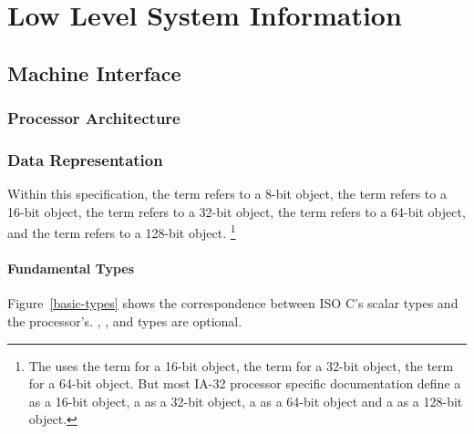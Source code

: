 \chapter{Low Level System Information}

\section{Machine Interface}

\subsection{Processor Architecture}

\subsection{Data Representation}

Within this specification, the term \emph{\textindex{\byte{}}} refers to
a 8-bit object, the term \emph{\textindex{\twobyte{}}} refers to a 16-bit
object, the term \emph{\textindex{\fourbyte{}}} refers to a 32-bit
object, the term \emph{\textindex{\eightbyte{}}} refers to a 64-bit
object, and the term \emph{\textindex{\sixteenbyte{}}} refers to a
128-bit object.%
\footnote{The \intelabi uses the term \emph{} for
  a 16-bit object, the term \emph{} for a 32-bit
  object, the term \emph{} for a 64-bit object.  But
  most IA-32 processor specific documentation define a
  \emph{} as a 16-bit object, a
  \emph{} as a 32-bit object, a
  \emph{} as a 64-bit object and a
  \emph{} as a 128-bit object.}

\subsubsection{Fundamental Types}

Figure~\ref{basic-types} shows the correspondence between ISO C's
scalar types and the processor's.  ,
,  and  types are optional.

